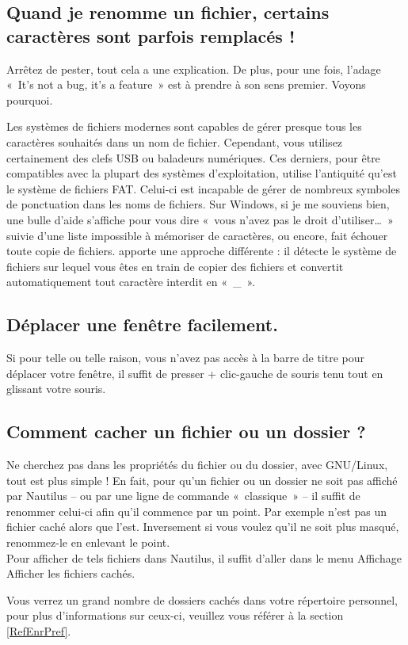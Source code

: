 \subsection{Quand je renomme un fichier, certains caractères sont parfois remplacés !}
Arrêtez de pester, tout cela a une explication. De plus, pour une fois, l'adage «~It's not a bug, it's a feature~» est à prendre à son sens premier. Voyons pourquoi.\par
Les systèmes de fichiers modernes sont capables de gérer presque tous les caractères souhaités dans un nom de fichier. Cependant, vous utilisez certainement des clefs USB ou baladeurs numériques. Ces derniers, pour être compatibles avec la plupart des systèmes d'exploitation, utilise l'antiquité qu'est le système de fichiers FAT. Celui-ci est incapable de gérer de nombreux symboles de ponctuation dans les noms de fichiers. Sur Windows, si je me souviens bien, une bulle d'aide s'affiche pour vous dire «~vous n'avez pas le droit d'utiliser\ldots{}~» suivie d'une liste impossible à mémoriser de caractères, ou encore, fait échouer toute copie de fichiers.  apporte une approche différente : il détecte le système de fichiers sur lequel vous êtes en train de copier des fichiers et convertit automatiquement tout caractère interdit en «~\_~».
\subsection{Déplacer une fenêtre facilement.}
Si pour telle ou telle raison, vous n'avez pas accès à la barre de titre pour déplacer votre fenêtre, il suffit de presser  + clic-gauche de souris tenu tout en glissant votre souris.
\subsection{Comment cacher un fichier ou un dossier ?}
\label{RefFichierCache}
Ne cherchez pas dans les propriétés du fichier ou du dossier, avec GNU/Linux, tout est plus simple ! En fait, pour qu'un fichier ou un dossier ne soit pas affiché par Nautilus -- ou par une ligne de commande «~classique~» -- il suffit de renommer celui-ci afin qu'il commence par un point. Par exemple  n'est pas un fichier caché alors que  l'est. Inversement si vous voulez qu'il ne soit plus masqué, renommez-le en enlevant le point.\\
Pour afficher de tels fichiers dans Nautilus, il suffit d'aller dans le menu Affichage \FlecheDroite Afficher les fichiers cachés.
\begin{nota}
Vous verrez un grand nombre de dossiers cachés dans votre répertoire personnel, pour plus d'informations sur ceux-ci, veuillez vous référer à la section \ref{RefEnrPref}.
\end{nota}
